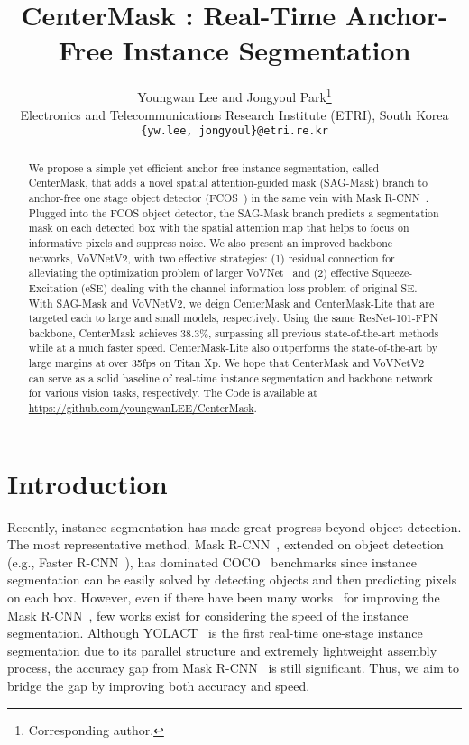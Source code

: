 \documentclass[10pt,twocolumn,letterpaper]{article}
\begin{document}
\title{CenterMask : Real-Time Anchor-Free Instance Segmentation}

\author{Youngwan Lee and Jongyoul Park\thanks{Corresponding author.}\\
Electronics and Telecommunications Research Institute (ETRI), South Korea\\
{\tt\small \{yw.lee, jongyoul\}@etri.re.kr}
}

\maketitle


\begin{abstract}
   We propose a simple yet efficient anchor-free instance segmentation, called CenterMask, that adds a novel spatial attention-guided mask (SAG-Mask) branch to anchor-free one stage object detector (FCOS~\cite{Tian_2019_ICCV}) in the same vein with Mask R-CNN~\cite{he2017mask}.
   Plugged into the FCOS object detector, the SAG-Mask branch predicts a segmentation mask on each detected box with the spatial attention map that helps to focus on informative pixels and suppress noise.
   We also present an improved backbone networks, VoVNetV2, with two effective strategies: (1) residual connection for alleviating the optimization problem of larger VoVNet~\cite{lee2019energy} and (2) effective Squeeze-Excitation (eSE) dealing with the channel information loss problem of original SE. 
   With SAG-Mask and VoVNetV2, we deign CenterMask and CenterMask-Lite that are targeted each to large and small models, respectively.
   Using the same ResNet-101-FPN backbone, CenterMask achieves 38.3\%, surpassing all previous state-of-the-art methods while at a much faster speed.
   CenterMask-Lite also outperforms the state-of-the-art by large margins at over 35fps on Titan Xp.
   We hope that CenterMask and VoVNetV2 can serve as a solid baseline of real-time instance segmentation and backbone network for various vision tasks, respectively. 
   The Code is available at \url{https://github.com/youngwanLEE/CenterMask}.
\end{abstract}



\section{Introduction}
Recently, instance segmentation has made great progress beyond object detection.
The most representative method, Mask R-CNN~\cite{he2017mask}, extended on object detection (e.g., Faster R-CNN~\cite{ren2015faster}), has dominated COCO~\cite{lin2014microsoft} benchmarks since instance segmentation can be easily solved by detecting objects and then predicting pixels on each box.
However, even if there have been many works~\cite{huang2019mask,cai2018cascade,chen2019hybrid,li2019scale,liu2018path} for improving the Mask R-CNN~\cite{he2017mask}, few works exist for considering the speed of the instance segmentation. 
Although YOLACT~\cite{Bolya_2019_ICCV} is the first real-time one-stage instance segmentation due to its parallel structure and extremely lightweight assembly process, the accuracy gap from Mask R-CNN~\cite{he2017mask} is still significant. Thus, we aim to bridge the gap by improving both accuracy and speed.
\end{document}
